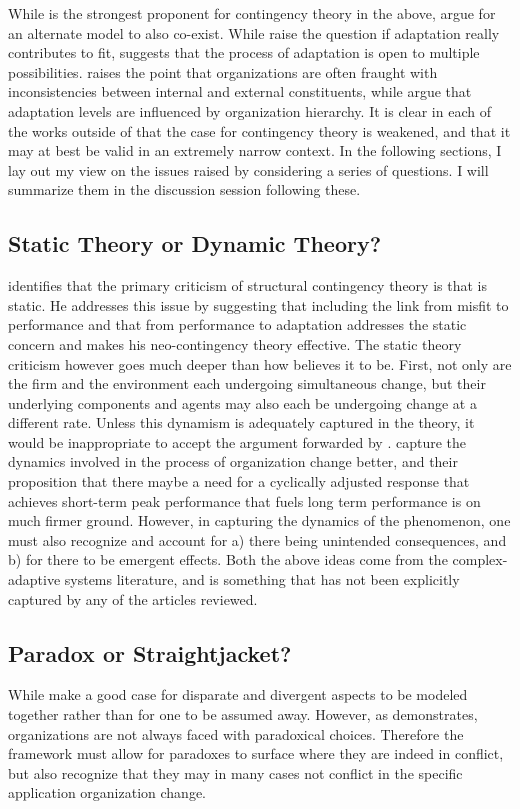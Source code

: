 \documentclass[12pt]{article}
\begin{document}
While \cite{Donaldson1987} is the strongest proponent for contingency theory in the above, \cite{Smith2011} argue for an alternate model to also co-exist. While \cite{Menz2014} raise the question if adaptation really contributes to fit, \cite{Siggelkow2002} suggests that the process of adaptation is open to multiple possibilities. \cite{Miller1992} raises the point that organizations are often fraught with inconsistencies between internal and external constituents, while \cite{Ethiraj2004} argue that adaptation levels are influenced by organization hierarchy. It is clear in each of the works outside of \cite{Donaldson1987} that the case for contingency theory is weakened, and that it may at best be valid in an extremely narrow context. In the following sections, I lay out my view on the issues raised by considering a series of questions. I will summarize them in the discussion session following these.

\subsection{Static Theory or Dynamic Theory?}
\cite{Donaldson1987} identifies that the primary criticism of structural contingency theory is that is static. He addresses this issue by suggesting that including the link from misfit to performance and that from performance to adaptation addresses the static concern and makes his neo-contingency theory effective. The static theory criticism however goes much deeper than how \cite{Donaldson1987} believes it to be. First, not only are the firm and the environment each undergoing simultaneous change, but their underlying components and agents may also each be undergoing change at a different rate. Unless this dynamism is adequately captured in the theory, it would be inappropriate to accept the argument forwarded by \cite{Donaldson1987}. \cite{Smith2011} capture the dynamics involved in the process of organization change better, and their proposition that there maybe a need for a cyclically adjusted response that achieves short-term peak performance that fuels long term performance is on much firmer ground. However, in capturing the dynamics of the phenomenon, one must also recognize and account for a) there being unintended consequences, and b) for there to be emergent effects. Both the above ideas come from the complex-adaptive systems literature, and is something that has not been explicitly captured by any of the articles reviewed. 

\subsection{Paradox or Straightjacket?}
While \cite{Smith2011} make a good case for disparate and divergent aspects to be modeled together rather than for one to be assumed away. However, as \cite{Miller1992} demonstrates, organizations are not always faced with paradoxical choices. Therefore the framework must allow for paradoxes to surface where they are indeed in conflict, but also recognize that they may in many cases not conflict in the specific application organization change. 
\end{document}
